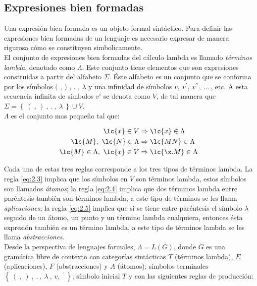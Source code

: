 \subsection{Expresiones bien formadas} \label{sec:1.2.1}

Una expresión bien formada es un objeto formal sintáctico. Para definir las
expresiones bien formadas de un lenguaje es necesario expresar de manera
rigurosa cómo se constituyen simbolicamente. \\

El conjunto de expresiones bien formadas del cálculo lambda es llamado
\emph{términos lambda}, denotado como \(\Lambda\). Este conjunto tiene elementos
que son expresiones construidas a partir del alfabeto \(\Sigma\). Éste alfabeto
es un conjunto que se conforma por los símbolos \((\) , \()\) , \(.\) ,
\(\lambda\) y una infinidad de símbolos \(v ,\ v^{\prime} ,\ v^{\prime\prime} ,\
\dots\ \), etc. A esta secuencia infinita de símbolos \(v^i\) se denota como
\(V\), de tal manera que \(\Sigma = \left\{\ (\ ,\ )\ ,\ .\ ,\ \lambda\ \right\}
\cup V\).\\

\(\Lambda\) es el conjunto mas pequeño tal que:

\begin{align}
  \label{eq:2.3} \lc{x} \in V &\Rightarrow \lc{x} \in \Lambda\\
  \label{eq:2.4} \lc{M},\ \lc{N} \in \Lambda &\Rightarrow \lc{M N} \in \Lambda\\
  \label{eq:2.5} \lc{M} \in \Lambda,\ \lc{x} \in V &\Rightarrow \lc{\x.M} \in
\Lambda
\end{align}

Cada una de estas tres reglas corresponde a los tres tipos de términos lambda.
La regla \eqref{eq:2.3} implica que los símbolos en \(V\) son términos lambda,
estos símbolos son llamados \emph{átomos}; la regla \eqref{eq:2.4} implica que
dos términos lambda entre paréntesis también son términos lambda, a este tipo de
términos se les llama \emph{aplicaciones}; la regla \eqref{eq:2.5} implica que
si se tiene entre paréntesis el símbolo \(\lambda\) seguido de un átomo, un
punto y un término lambda cualquiera, entonces ésta expresión también es un
término lambda, a este tipo de términos lambda se les llama
\emph{abstracciones}.\\

Desde la perspectiva de lenguajes formales, \(\Lambda = L(G)\), donde \(G\) es
una gramática libre de contexto con categorías sintácticas \(T\) (términos
lambda), \(E\) (aplicaciones), \(F\) (abstracciones) y \(A\) (átomos); símbolos
terminales \(\left\{\ (\ ,\ )\ ,\ .\ ,\ \lambda\ ,\ v,\ {}^{\prime}\ \right\}\);
símbolo inicial \(T\) y con las siguientes reglas de producción:


